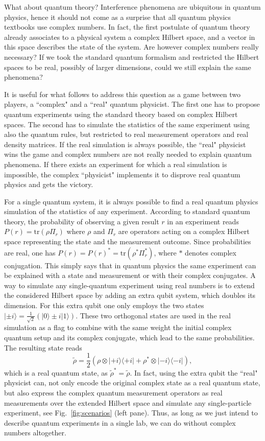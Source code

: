 \documentclass[onecolumn,prx,amsmath,amssymb,12pt]{revtex4-2}
\def\bra#1{\langle#1|} \def\ket#1{|#1\rangle}
\def\proj#1{\ket{#1}\!\bra{#1}}
\def\tr{\mbox{tr}}
\begin{document}
What about quantum theory? Interference phenomena are ubiquitous in quantum physics, hence it should not come as a surprise that all quantum physics textbooks use complex numbers. In fact, the first postulate of quantum theory already associates to a physical system a complex Hilbert space, and a vector in this space describes the state of the system. Are however complex numbers really necessary? If we took the standard quantum formalism and restricted the Hilbert spaces to be real, possibly of larger dimensions, could we still explain the same phenomena?


It is useful for what follows to address this question as a game between two players, a ``complex" and a ``real" quantum physicist. The first one has to propose quantum experiments using the standard theory based on complex Hilbert spaces. The second has to simulate the statistics of the same experiment using also the quantum rules, but restricted to real measurement operators and real density matrices. If the real simulation is always possible, the ``real" physicist wins the game and complex numbers are not really needed to explain quantum phenomena. If there exists an experiment for which a real simulation is impossible, the complex ``physicist" implements it to disprove real quantum physics and gets the victory.

For a single quantum system, it is always possible to find a real quantum physics simulation of the statistics of any experiment. According to standard quantum theory, the probability of observing a given result $r$ in an experiment reads $P(r)=\tr(\rho \Pi_r)$ where $\rho$ and $\Pi_r$ are operators acting on a complex Hilbert space representing the state and the measurement outcome. Since probabilities are real, one has $P(r)=P(r)^*=\tr(\rho^* \Pi^*_r)$, where $*$ denotes complex conjugation. This simply says that in quantum physics the same experiment can be explained with a state and measurement or with their complex conjugates. A way to simulate any single-quantum experiment using real numbers is to extend the considered Hilbert space by adding an extra qubit system, which doubles its dimension. For this extra qubit one only employs the two states $\ket{\pm i}=\frac{1}{\sqrt{2}}(\ket{0}\pm i\ket{1})$. These two orthogonal states are used in the real simulation as a flag to combine with the same weight the initial complex quantum setup and its complex conjugate, which lead to the same probabilities. The resulting state reads 
\begin{equation}
\label{eq:realstate}
\tilde{\rho} = \frac{1}{2}(\rho\otimes\proj{+i} + \rho^*\otimes\proj{-i}) ,
\end{equation}
which is a real quantum state, as $\tilde{\rho}^*=\tilde{\rho}$. In fact, using the extra qubit the ``real" physicist can, not only encode the original complex state as a real quantum state, but also express the complex quantum measurement operators as real measurements over the extended Hilbert space and simulate any single-particle experiment, see Fig.~\ref{fig:scenarios} (left pane). Thus, as long as we just intend to describe quantum experiments in a single lab, we can do without complex numbers altogether.
\end{document}
